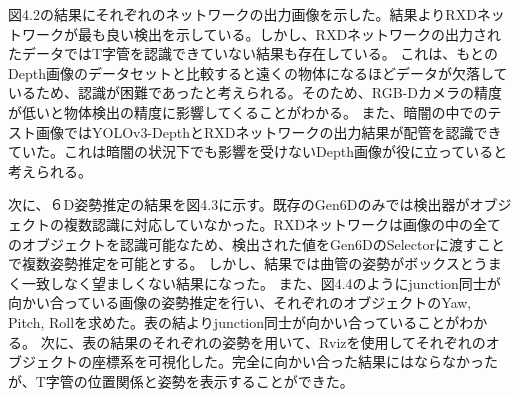 \begin{table}[htbp]
\centering
\caption{テスト画像を用いた検出結果}
\end{table}
図4.2の結果にそれぞれのネットワークの出力画像を示した。結果よりRXDネットワークが最も良い検出を示している。しかし、RXDネットワークの出力されたデータではT字管を認識できていない結果も存在している。
これは、もとのDepth画像のデータセットと比較すると遠くの物体になるほどデータが欠落しているため、認識が困難であったと考えられる。そのため、RGB-Dカメラの精度が低いと物体検出の精度に影響してくることがわかる。
また、暗闇の中でのテスト画像ではYOLOv3-DepthとRXDネットワークの出力結果が配管を認識できていた。これは暗闇の状況下でも影響を受けないDepth画像が役に立っていると考えられる。

次に、６D姿勢推定の結果を図4.3に示す。既存のGen6Dのみでは検出器がオブジェクトの複数認識に対応していなかった。RXDネットワークは画像の中の全てのオブジェクトを認識可能なため、検出された値をGen6DのSelectorに渡すことで複数姿勢推定を可能とする。
しかし、結果では曲管の姿勢がボックスとうまく一致しなく望ましくない結果になった。
また、図4.4のようにjunction同士が向かい合っている画像の姿勢推定を行い、それぞれのオブジェクトのYaw, Pitch, Rollを求めた。表の結よりjunction同士が向かい合っていることがわかる。
次に、表の結果のそれぞれの姿勢を用いて、Rvizを使用してそれぞれのオブジェクトの座標系を可視化した。完全に向かい合った結果にはならなかったが、T字管の位置関係と姿勢を表示することができた。

